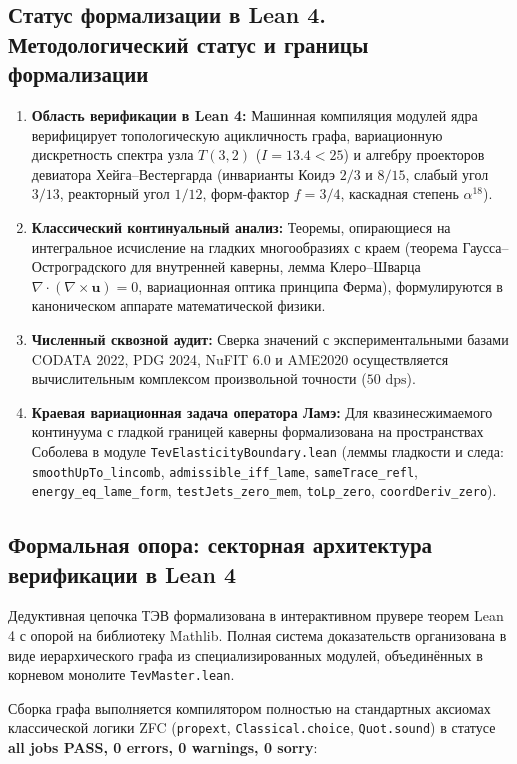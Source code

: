 \documentclass[11pt,a4paper]{article}
\theoremstyle{definition}
\theoremstyle{remark}
\begin{document}
\subsection{Статус формализации в Lean 4. Методологический статус и границы формализации}
\label{rem:lean_formalization_scope}

\begin{enumerate}
	\item \textbf{Область верификации в Lean 4:} Машинная компиляция модулей ядра верифицирует топологическую ацикличность графа, вариационную дискретность спектра узла $T(3,2)$ ($I = 13.4 < 25$) и алгебру проекторов девиатора Хейга--Вестергарда (инварианты Коидэ $2/3$ и $8/15$, слабый угол $3/13$, реакторный угол $1/12$, форм-фактор $f = 3/4$, каскадная степень $\alpha^{18}$).
	\item \textbf{Классический континуальный анализ:} Теоремы, опирающиеся на интегральное исчисление на гладких многообразиях с краем (теорема Гаусса--Остроградского для внутренней каверны, лемма Клеро--Шварца $\nabla \cdot (\nabla \times \mathbf{u}) = 0$, вариационная оптика принципа Ферма), формулируются в каноническом аппарате математической физики.
	\item \textbf{Численный сквозной аудит:} Сверка значений с экспериментальными базами CODATA 2022, PDG 2024, NuFIT 6.0 и AME2020 осуществляется вычислительным комплексом произвольной точности ($50\text{ dps}$).
	\item \textbf{Краевая вариационная задача оператора Ламэ:}  Для квазинесжимаемого континуума с гладкой границей каверны формализована на пространствах Соболева в модуле \texttt{TevElasticityBoundary.lean} (леммы гладкости и следа: \texttt{smoothUpTo_lincomb}, \texttt{admissible_iff_lame}, \texttt{sameTrace_refl}, \texttt{energy_eq_lame_form}, \texttt{testJets_zero_mem}, \texttt{toLp_zero}, \texttt{coordDeriv_zero}).
\end{enumerate}

\subsection*{Формальная опора: секторная архитектура верификации в Lean 4}

Дедуктивная цепочка ТЭВ формализована в интерактивном прувере теорем Lean 4 с опорой на библиотеку Mathlib. Полная система доказательств организована в виде иерархического графа из специализированных модулей, объединённых в корневом монолите \texttt{TevMaster.lean}.

Сборка графа выполняется компилятором полностью на стандартных аксиомах классической логики ZFC (\texttt{propext}, \texttt{Classical.choice}, \texttt{Quot.sound}) в статусе \textbf{all jobs PASS, 0 errors, 0 warnings, 0 sorry}:
\end{document}
